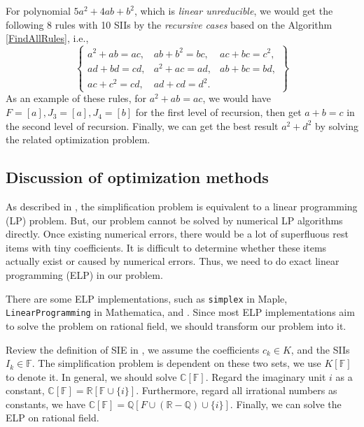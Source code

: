 For polynomial $5a^2+4ab+b^2$, which is \emph{linear unreducible}, we would get the following 8 rules with 10 SIIs by the \emph{recursive cases} based on the Algorithm \ref{FindAllRules}, i.e., 
\begin{equation}
\left\{ 
\begin{matrix}
a^2+ab=ac, &ab+b^2=bc, &ac+bc=c^2, \\
ad+bd=cd,  &a^2+ac=ad, &ab+bc=bd,  \\ 
ac+c^2=cd, &ad+cd=d^2. &
\end{matrix}
\right\}
\end{equation}
As an example of these rules, for $a^2+ab=ac$, we would have $F=[a],J_3=[a],J_4=[b]$ for the first level of recursion, then get $a+b=c$ in the second level of recursion. Finally, we can get the best result $a^2+d^2$ by solving the related optimization problem. 

\subsection{Discussion of optimization methods}\label{optMethods-03}

As described in , the simplification problem is equivalent to a linear programming (LP) problem. But, our problem cannot be solved by numerical LP algorithms directly. Once existing numerical errors, there would be a lot of superfluous rest items with tiny coefficients. It is difficult to determine whether these items actually exist or caused by numerical errors. Thus, we need to do exact linear programming (ELP) in our problem. 

There are some ELP implementations, such as \texttt{simplex} in Maple, \texttt{LinearProgramming} in Mathematica,  \citep{soplex} and  \citep{qsoptex}. Since most ELP implementations aim to solve the problem on rational field, we should transform our problem into it. 

Review the definition of SIE in , we assume the coefficients $c_k\in K$, and the SIIs $I_k\in \mathbb F$. The simplification problem is dependent on these two sets, we use $K[\mathbb F]$ to denote it. In general, we should solve $\mathbb C[\mathbb F]$. Regard the imaginary unit $i$ as a constant, $\mathbb C[\mathbb F]=\mathbb R[\mathbb F \cup \{i\}]$. Furthermore, regard all  irrational numbers as constants, we have $\mathbb C[\mathbb F]=\mathbb Q[F\cup (\mathbb R - \mathbb Q) \cup \{i\}]$. Finally, we can solve the ELP on rational field.

